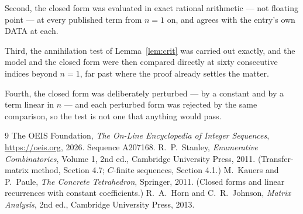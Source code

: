 \documentclass[11pt,a4paper]{article}
\theoremstyle{plain}
\theoremstyle{definition}
\begin{document}
Second, the closed form was evaluated in exact rational arithmetic --- not floating point ---
at every published term from $n=1$ on, and agrees with the entry's own DATA at each.

Third, the annihilation test of Lemma~\ref{lem:crit} was carried out exactly, and the model
and the closed form were then compared directly at sixty consecutive indices beyond
$n=1$, far past where the proof already settles the matter.

Fourth, the closed form was deliberately perturbed --- by a constant and by a term linear in
$n$ --- and each perturbed form was rejected by the same comparison, so the test is not one
that anything would pass.

\begin{thebibliography}{9}
 The OEIS Foundation, \emph{The On-Line Encyclopedia of Integer
Sequences}, \url{https://oeis.org}, 2026. Sequence A207168.
 R.~P.~Stanley, \emph{Enumerative Combinatorics}, Volume 1, 2nd ed.,
Cambridge University Press, 2011. (Transfer-matrix method, Section 4.7; $C$-finite sequences,
Section 4.1.)
 M.~Kauers and P.~Paule, \emph{The Concrete Tetrahedron}, Springer, 2011.
(Closed forms and linear recurrences with constant coefficients.)
 R.~A.~Horn and C.~R.~Johnson, \emph{Matrix Analysis}, 2nd ed., Cambridge
University Press, 2013.
\end{thebibliography}
\end{document}
